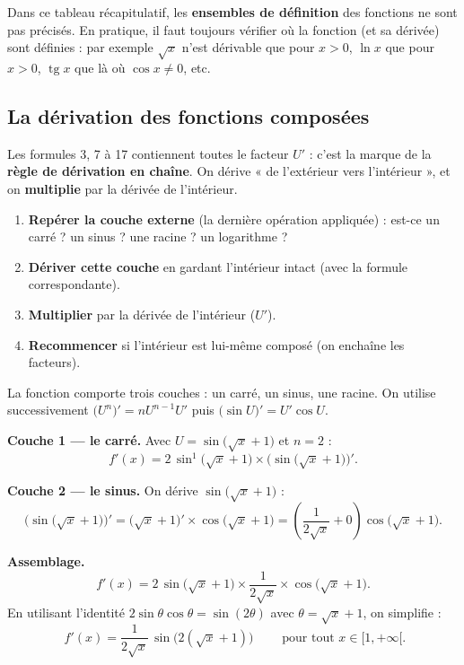 \documentclass[11pt,a4paper]{article}
\newcommand{\tg}{\operatorname{tg}}
\begin{document}
\begin{remarque}
Dans ce tableau récapitulatif, les \textbf{ensembles de définition} des fonctions ne sont pas précisés.
En pratique, il faut toujours vérifier où la fonction (et sa dérivée) sont définies : par exemple
$\sqrt{x}$ n'est dérivable que pour $x>0$, $\ln x$ que pour $x>0$, $\tg x$ que là où $\cos x\neq 0$, etc.
\end{remarque}

\subsection{La dérivation des fonctions composées}

Les formules 3, 7 à 17 contiennent toutes le facteur $U'$ : c'est la marque de la
\textbf{règle de dérivation en chaîne}. On dérive « de l'extérieur vers l'intérieur », et on
\textbf{multiplie} par la dérivée de l'intérieur.

\begin{commentfaire}
\begin{enumerate}[leftmargin=1.8em,topsep=2pt,itemsep=2pt]
  \item \textbf{Repérer la couche externe} (la dernière opération appliquée) : est-ce un carré ?
        un sinus ? une racine ? un logarithme ?
  \item \textbf{Dériver cette couche} en gardant l'intérieur intact (avec la formule correspondante).
  \item \textbf{Multiplier} par la dérivée de l'intérieur ($U'$).
  \item \textbf{Recommencer} si l'intérieur est lui-même composé (on enchaîne les facteurs).
\end{enumerate}
\end{commentfaire}

\begin{exemple}[Composition de plusieurs couches : $y=\sin^2\big(\sqrt{x}+1\big)$]
La fonction comporte trois couches : un carré, un sinus, une racine. On utilise successivement
$\big(U^n\big)'=nU^{n-1}U'$ puis $\big(\sin U\big)'=U'\cos U$.

\medskip
\textbf{Couche 1 — le carré.} Avec $U=\sin\big(\sqrt{x}+1\big)$ et $n=2$ :
\[
   f'(x)=2\,\sin^{1}\big(\sqrt{x}+1\big)\times\Big(\sin\big(\sqrt{x}+1\big)\Big)'.
\]

\textbf{Couche 2 — le sinus.} On dérive $\sin\big(\sqrt{x}+1\big)$ :
\[
   \Big(\sin\big(\sqrt{x}+1\big)\Big)'=\big(\sqrt{x}+1\big)'\times\cos\big(\sqrt{x}+1\big)
   =\left(\frac{1}{2\sqrt{x}}+0\right)\cos\big(\sqrt{x}+1\big).
\]

\textbf{Assemblage.}
\[
   f'(x)=2\,\sin\big(\sqrt{x}+1\big)\times\frac{1}{2\sqrt{x}}\times\cos\big(\sqrt{x}+1\big).
\]
En utilisant l'identité $2\sin\theta\cos\theta=\sin(2\theta)$ avec $\theta=\sqrt{x}+1$, on simplifie :
\[
   \boxed{\;f'(x)=\frac{1}{2\sqrt{x}}\,\sin\big(2(\sqrt{x}+1)\big)\;}\qquad \text{pour tout } x\in[1,+\infty[.
\]
\end{exemple}
\end{document}
